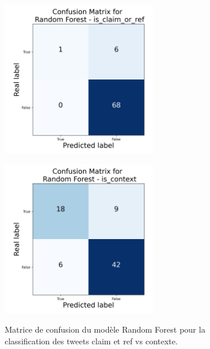 \begin{figure}[h]
    \centering
    \begin{minipage}[b]{0.49\textwidth}
        \centering
        \includegraphics[width=0.6\textwidth]{images/confusion_2.json-Random Forest_is_claim_or_ref_confusion_matrix}
        \label{fig:confusion_2_1}
    \end{minipage}
    \hfill
    \begin{minipage}[b]{0.49\textwidth}
        \centering
        \includegraphics[width=0.6\textwidth]{images/confusion_2.json-Random Forest_is_context_confusion_matrix}
        \label{fig:confusion_2_2}
    \end{minipage}
    \caption{Matrice de confusion du modèle Random Forest pour la classification des tweets claim et ref vs contexte.}
    \label{fig:confusion_2}
\end{figure}

